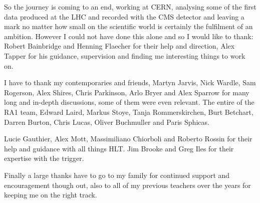 \begin{acknowledgements}
So the journey is coming to an end, working at CERN, analysing some of the 
first data produced at the LHC and recorded with the CMS detector and leaving 
a mark no matter how small on the scientific world is certainly the fulfilment 
of an ambition. However I could not have done this alone and so I would like to 
thank: Robert Bainbridge and Henning Flaecher for their help and direction, 
Alex Tapper for his guidance, supervision and finding me interesting things to 
work on.

I have to thank my contemporaries and friends, Martyn Jarvis, Nick Wardle, Sam 
Rogerson, Alex Shires, Chris Parkinson, Arlo Bryer and Alex Sparrow for many 
long and in-depth discussions, some of them were even relevant. The entire of 
the RA1 team, Edward Laird, Markus Stoye, Tanja Rommerskirchen, Burt Betchart, 
Darren Burton, Chris Lucas, Oliver Buchmuller and Paris Sphicas.

Lucie Gauthier, Alex Mott, Massimiliano Chiorboli and Roberto Rossin for their 
help and guidance with all things HLT. Jim Brooke and Greg Iles for their 
expertise with the \Lone trigger.

Finally a large thanks have to go to my family for continued support and 
encouragement though out, also to all of my previous teachers over the years 
for keeping me on the right track.

\end{acknowledgements}

